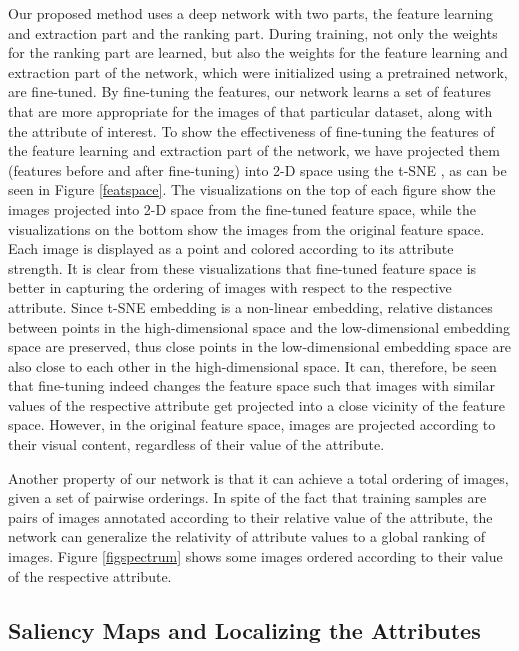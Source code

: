 \documentclass[runningheads]{llncs}
\begin{document}
Our proposed method uses a deep network with two parts, the feature learning and extraction part and the ranking part. During training, not only the weights for the ranking part are learned, but also the weights for the feature learning and extraction part of the network, which were initialized using a pretrained network, are fine-tuned. By fine-tuning the features, our network learns a set of features that are more appropriate for the images of that particular dataset, along with the attribute of interest. To show the effectiveness of fine-tuning the features of the feature learning and extraction part of the network, we have projected them (features before and after fine-tuning) into 2-D space using the t-SNE \cite{van2008visualizing}, as can be seen in Figure \ref{featspace}. The visualizations on the top of each figure show the images projected into 2-D space from the fine-tuned feature space, while the visualizations on the bottom show the images from the original feature space. Each image is displayed as a point and colored according to its attribute strength. It is clear from these visualizations that fine-tuned feature space is better in capturing the ordering of images with respect to the respective attribute. Since t-SNE embedding is a non-linear embedding, relative distances between points in the high-dimensional space and the low-dimensional embedding space are preserved, thus close points in the low-dimensional embedding space are also close to each other in the high-dimensional space. It can, therefore, be seen that fine-tuning indeed changes the feature space such that images with similar values of the respective attribute get projected into a close vicinity of the feature space. However, in the original feature space, images are projected according to their visual content, regardless of their value of the attribute.

Another property of our network is that it can achieve a total ordering of images, given a set of pairwise orderings. In spite of the fact that training samples are pairs of images annotated according to their relative value of the attribute, the network can generalize the relativity of attribute values to a global ranking of images. Figure \ref{figspectrum} shows some images ordered according to their value of the respective attribute. 

\subsection{Saliency Maps and Localizing the Attributes} \label{sec.4.5}
\end{document}
